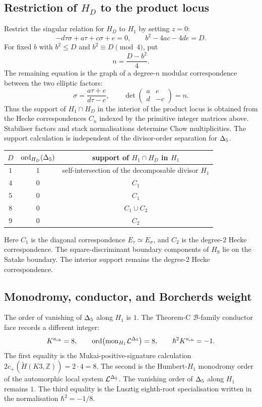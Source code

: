 \subsection*{Restriction of $H_D$ to the product locus}
Restrict the singular relation for $H_D$ to $H_1$ by setting $z=0$:
\[
  -d\tau\sigma+a\tau+c\sigma+e=0,\qquad
  b^2-4ac-4de=D.
\]
For fixed $b$ with $b^2\le D$ and $b^2\equiv D\pmod 4$, put
\[
  n=\frac{D-b^2}{4}.
\]
The remaining equation is the graph of a degree-$n$ modular
correspondence between the two elliptic factors:
\[
  \sigma=\frac{a\tau+e}{d\tau-c},\qquad
  \det\begin{pmatrix}a&e\\ d&-c\end{pmatrix}=n .
\]
Thus the support of $H_1\cap H_D$ in the interior of the product locus
is obtained from the Hecke correspondences $C_n$ indexed by the
primitive integer matrices above.  Stabiliser factors and stack
normalisations determine Chow multiplicities.  The support calculation
is independent of the divisor-order separation for $\Delta_5$.

\begin{center}
\renewcommand{\arraystretch}{1.15}
\begin{tabular}{c|c|c}
$D$ & $\operatorname{ord}_{H_D}(\Delta_5)$ & support of $H_1\cap H_D$ in $H_1$ \\\hline
$1$ & $1$ & self-intersection of the decomposable divisor $H_1$ \\
$4$ & $0$ & $C_1$ \\
$5$ & $0$ & $C_1$ \\
$8$ & $0$ & $C_1\cup C_2$ \\
$9$ & $0$ & $C_2$ \\
\end{tabular}
\end{center}

Here $C_1$ is the diagonal correspondence $E_\tau\simeq E_\sigma$, and
$C_2$ is the degree-$2$ Hecke correspondence.  The square-discriminant
boundary components of $H_9$ lie on the Satake boundary.  The interior
support remains the degree-\(2\) Hecke correspondence.

\subsection*{Monodromy, conductor, and Borcherds weight}
The order of vanishing of $\Delta_5$ along $H_1$ is $1$.  The
Theorem-C $\mathcal B$-family conductor face records a different
integer:
\[
  K^{\kappa_{\mathrm{ch}}}=8,\qquad
  \operatorname{ord}\bigl(\mathrm{mon}_{H_1}\mathcal L^{\Delta_5}\bigr)=8,
  \qquad
  \hbar^2 K^{\kappa_{\mathrm{ch}}}=-1 .
\]
The first equality is the Mukai-positive-signature calculation
$2c_+(\widetilde H(K3,\mathbb Z))=2\cdot4=8$.  The second is the
Humbert-$H_1$ monodromy order of the automorphic local system
$\mathcal L^{\Delta_5}$.  The vanishing order of $\Delta_5$ along
\(H_1\) remains \(1\).  The third equality is the Lusztig
eighth-root specialisation written in the normalisation
$\hbar^2=-1/8$.

